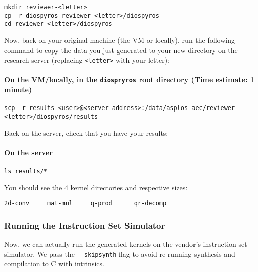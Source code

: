 \begin{verbatim}
mkdir reviewer-<letter>
cp -r diospyros reviewer-<letter>/diospyros
cd reviewer-<letter>/diospyros
\end{verbatim}

Now, back on your original machine (the VM or locally), run the
following command to copy the data you just generated to your new
directory on the research server (replacing
\texttt{\textless{}letter\textgreater{}} with your letter):

\hypertarget{on-the-vmlocally-in-the-diospryros-root-directory-time-estimate-1-minute}{%
\paragraph{\texorpdfstring{On the VM/locally, in the \texttt{diospryros}
root directory (Time estimate: 1
minute)}{On the VM/locally, in the diospryros root directory (Time estimate: 1 minute)}}\label{on-the-vmlocally-in-the-diospryros-root-directory-time-estimate-1-minute}}

\begin{verbatim}
scp -r results <user>@<server address>:/data/asplos-aec/reviewer-<letter>/diospyros/results
\end{verbatim}

Back on the server, check that you have your results:

\hypertarget{on-the-server-2}{%
\paragraph{On the server}\label{on-the-server-2}}

\begin{verbatim}
ls results/*
\end{verbatim}

You should see the 4 kernel directories and respective sizes:

\begin{verbatim}
2d-conv     mat-mul     q-prod      qr-decomp
\end{verbatim}

\hypertarget{running-the-instruction-set-simulator}{%
\subsubsection{Running the Instruction Set
Simulator}\label{running-the-instruction-set-simulator}}

Now, we can actually run the generated kernels on the vendor's
instruction set simulator. We pass the \texttt{-\/-skipsynth} flag to
avoid re-running synthesis and compilation to C with intrinsics.

